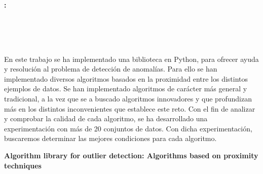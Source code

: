 \chapter*{}






\cleardoublepage
\thispagestyle{empty}

\begin{center}
{\large\bfseries \myTitle: \mySubTitle}\\
\end{center}
\begin{center}
\myName\\
\end{center}

\\

\vspace{0.7cm}
\\

En este trabajo se ha implementado una biblioteca en Python, para ofrecer
ayuda y resolución al problema de detección de anomalías. Para ello se han
implementado diversos algoritmos basados en la proximidad entre los distintos
ejemplos de datos. Se han implementado algoritmos de carácter más general y
tradicional, a la vez que se a buscado algoritmos innovadores y que profundizan 
más en los distintos inconvenientes que establece este reto. Con el fin de
analizar y comprobar la calidad de cada algoritmo, se ha desarrollado una 
experimentación con más de 20 conjuntos de datos. Con dicha experimentación,
buscaremos determinar las mejores condiciones para cada algoritmo.
\cleardoublepage


\thispagestyle{empty}


\begin{center}
{\large\bfseries 
Algorithm library for outlier detection: 
Algorithms based on proximity techniques}\\
\end{center}
\begin{center}
\myName\\
\end{center}

\\

